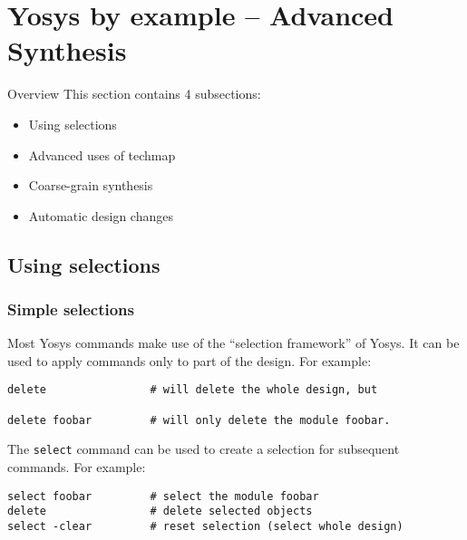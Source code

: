 
\section{Yosys by example -- Advanced Synthesis}

\begin{frame}
\sectionpage
\end{frame}

\begin{frame}{Overview}
This section contains 4 subsections:
\begin{itemize}
\item Using selections
\item Advanced uses of techmap
\item Coarse-grain synthesis
\item Automatic design changes
\end{itemize}
\end{frame}


\subsection{Using selections}

\begin{frame}
\subsectionpage
\subsectionpagesuffix
\end{frame}

\subsubsection{Simple selections}

\begin{frame}[fragile]{\subsubsecname}
Most Yosys commands make use of the ``selection framework'' of Yosys. It can be used
to apply commands only to part of the design. For example:

\medskip
\begin{lstlisting}[xleftmargin=0.5cm, basicstyle=\ttfamily\fontsize{8pt}{10pt}\selectfont, language=ys]
delete                # will delete the whole design, but

delete foobar         # will only delete the module foobar.
\end{lstlisting}

\bigskip
The {\tt select} command can be used to create a selection for subsequent
commands. For example:

\medskip
\begin{lstlisting}[xleftmargin=0.5cm, basicstyle=\ttfamily\fontsize{8pt}{10pt}\selectfont, language=ys]
select foobar         # select the module foobar
delete                # delete selected objects
select -clear         # reset selection (select whole design)
\end{lstlisting}
\end{frame}

